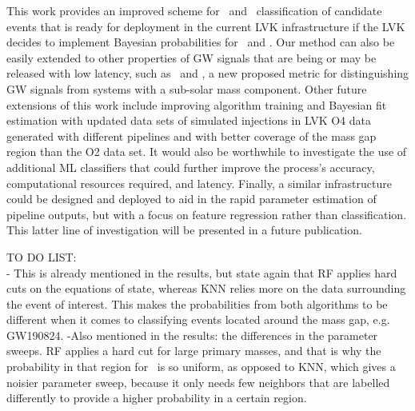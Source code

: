 This work provides an improved scheme for \hasns\ and \hasrem\ classification of candidate events that is ready for deployment in the current \ac{LVK} infrastructure if the \ac{LVK} decides
to implement Bayesian probabilities for \hasns\ and \hasrem. Our method can also be easily extended to other properties of \ac{GW} signals that are being or may be released with low latency, such
as \hasgap\ and \hasssm, a new proposed metric for distinguishing \ac{GW} signals from systems with a sub-solar mass component. Other future extensions of this work include improving
algorithm training and Bayesian fit estimation with updated data sets of simulated injections in \ac{LVK} \ac{O4} data generated with different pipelines and with better coverage of the mass
gap region than the \ac{O2} data set. It would also be worthwhile to investigate the use of additional ML classifiers that could further improve the process's accuracy, computational
resources required, and latency. Finally, a similar infrastructure could be designed and deployed to aid in the rapid parameter estimation of pipeline outputs, but with a focus on feature regression rather than classification. This latter line of investigation will be presented in a future publication.


TO DO LIST:
\\

- This is already mentioned in the results, but state again that RF applies hard cuts on the equations of state, whereas KNN relies more on the data surrounding the event of interest. This makes the probabilities from both algorithms to be different when it comes to classifying events located around the mass gap, e.g. GW190824. 
-Also mentioned in the results: the differences in the parameter sweeps. RF applies a hard cut for large primary masses, and that is why the probability in that region for \hasns\ is so uniform, as opposed to KNN, which gives a noisier parameter sweep, because it only needs few neighbors that are labelled differently to provide a higher probability in a certain region.  \\
